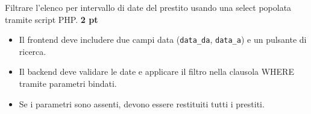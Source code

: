 \documentclass[a4paper,12pt]{article}
\begin{document}
	Filtrare l'elenco per intervallo di date del prestito usando una select popolata
	tramite script PHP. \textbf{2 pt}
	
	\begin{itemize}
		\item Il frontend deve includere due campi data (\texttt{data\_da},
		\texttt{data\_a}) e un pulsante di ricerca.
		\item Il backend deve validare le date e applicare il filtro nella clausola
		WHERE tramite parametri bindati.
		\item Se i parametri sono assenti, devono essere restituiti tutti i prestiti.
	\end{itemize}
	
\end{document}

